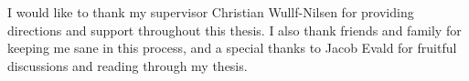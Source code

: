I would like to thank my supervisor Christian Wullf-Nilsen for providing directions and support
throughout this thesis. I also thank friends and family for keeping me sane in this process,
and a special thanks to Jacob Evald for fruitful discussions and reading through my thesis.
